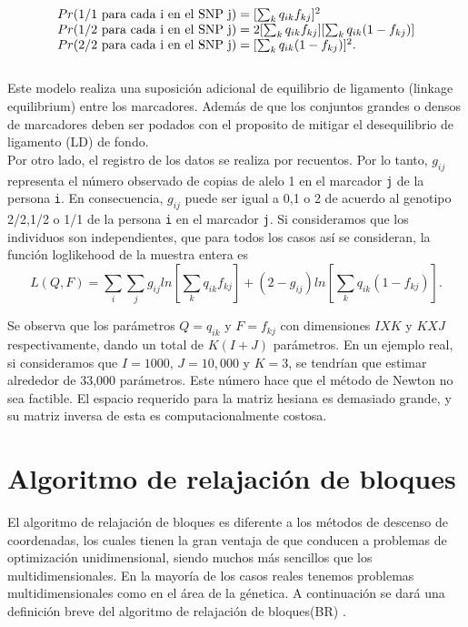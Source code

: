 \begin{equation}
  \begin{array}{l}
  Pr(\textup{1/1 para cada i en el SNP j}) = [\sum_{k} q_{ik}f_{kj}]^{2}\\
  Pr(\textup{1/2 para cada i en el SNP j}) = 2[\sum_{k}q_{ik}f_{kj}][\sum_{k}q_{ik}(1-f_{kj})]\\
  Pr(\textup{2/2 para cada i en el SNP j}) = [\sum_{k}q_{ik}(1-f_{kj})]^{2}.
  \end{array}
  \end{equation}\\

Este modelo realiza una suposici\'on adicional de equilibrio de ligamento (linkage equilibrium) entre los marcadores. Adem\'as de que los conjuntos grandes o densos de marcadores deben ser podados con el proposito de mitigar el desequilibrio de ligamento (LD) de fondo.\\

Por otro lado, el registro de los datos se realiza por recuentos. Por lo tanto, $g_{ij}$ representa el n\'umero observado de copias de alelo 1 en el marcador \texttt{j} de la persona \texttt{i}. En consecuencia, $g_{ij}$ puede ser igual a 0,1 o 2 de acuerdo al genotipo 2/2,1/2 o 1/1 de la persona \texttt{i} en el marcador \texttt{j}. Si consideramos que los individuos son independientes, que para todos los casos as\'i se consideran, la funci\'on loglikehood de la muestra entera es\\

\begin{equation}
  L(Q,F) = \sum_{i}\sum_{j}{g_{ij}ln[\sum_{k}q_{ik}f_{kj}] + (2-g_{ij})ln[\sum_{k}q_{ik}(1-f_{kj})]}.
\end{equation}

Se observa que los par\'ametros $Q={q_{ik}}$ y $F={f_{kj}}$ con dimensiones $IXK$ y $KXJ$ respectivamente, dando un total de $K(I + J)$ par\'ametros. En un ejemplo real, si consideramos que $I=1000$, $J=10,000$ y $K=3$, se tendr\'ian que estimar alrededor de 33,000 par\'ametros. Este n\'umero hace que el m\'etodo de Newton no sea factible. El espacio requerido para la matriz hesiana es demasiado grande, y su matriz inversa de esta es computacionalmente costosa.

\section{Algoritmo de relajaci\'on de bloques} \label{sec:BR}

El algoritmo de relajaci\'on de bloques es diferente a los m\'etodos de descenso de coordenadas, los cuales tienen la gran ventaja de que conducen a problemas de optimizaci\'on unidimensional, siendo muchos m\'as sencillos que los multidimensionales. En la mayor\'ia de los casos reales tenemos problemas multidimensionales como en el \'area de la g\'enetica. A continuaci\'on se dar\'a una definici\'on breve del algoritmo de relajaci\'on de bloques(BR) \cite{deLeeuw}.\\

